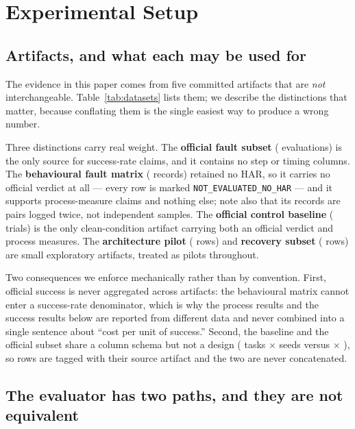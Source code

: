 \section{Experimental Setup}
\label{sec:setup}

\subsection{Artifacts, and what each may be used for}
\label{sec:artifacts}

The evidence in this paper comes from five committed artifacts that are \emph{not}
interchangeable. Table~\ref{tab:datasets} lists them; we describe the
distinctions that matter, because conflating them is the single easiest way to
produce a wrong number.



Three distinctions carry real weight. The \textbf{official fault subset}
(\OfficialN{} evaluations) is the only source for success-rate claims, and it
contains no step or timing columns. The \textbf{behavioural fault matrix}
(\TotalTrials{} records) retained no HAR, so it carries no official verdict at
all --- every row is marked \texttt{NOT\_EVALUATED\_NO\_HAR} --- and it supports
process-measure claims and nothing else; note also that its \TotalTrials{}
records are \MatrixPairs{} pairs logged twice, not independent samples. The
\textbf{official control baseline} (\BaselineN{} trials) is the only
clean-condition artifact carrying both an official verdict and process measures.
The \textbf{architecture pilot} (\ArchN{} rows) and \textbf{recovery subset}
(\RecN{} rows) are small exploratory artifacts, treated as pilots throughout.

Two consequences we enforce mechanically rather than by convention. First,
official success is never aggregated across artifacts: the behavioural matrix
cannot enter a success-rate denominator, which is why the process results and the
success results below are reported from different data and never combined into a
single sentence about ``cost per unit of success.'' Second, the baseline and the
official subset share a column schema but not a design (\BaselineTasks{} tasks
$\times$ \BaselineSeeds{} seeds versus \OfficialTasks{} $\times$ \TrialsPerCell{}),
so rows are tagged with their source artifact and the two are never concatenated.

\subsection{The evaluator has two paths, and they are not equivalent}
\label{sec:fallback}

